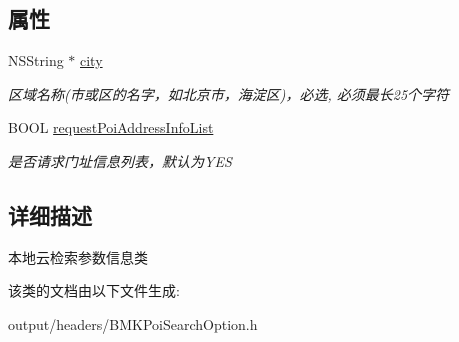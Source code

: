 \subsection*{属性}
\begin{DoxyCompactItemize}
\item 
\hypertarget{interface_b_m_k_city_search_option_af9e2e37c3edcd43445f58660e770f8b1}{}N\+S\+String $\ast$ \hyperlink{interface_b_m_k_city_search_option_af9e2e37c3edcd43445f58660e770f8b1}{city}\label{interface_b_m_k_city_search_option_af9e2e37c3edcd43445f58660e770f8b1}

\begin{DoxyCompactList}\small\item\em 区域名称(市或区的名字，如北京市，海淀区)，必选, 必须最长25个字符 \end{DoxyCompactList}\item 
\hypertarget{interface_b_m_k_city_search_option_abeee3cea1b782d8ca08a558f400568c3}{}B\+O\+O\+L \hyperlink{interface_b_m_k_city_search_option_abeee3cea1b782d8ca08a558f400568c3}{request\+Poi\+Address\+Info\+List}\label{interface_b_m_k_city_search_option_abeee3cea1b782d8ca08a558f400568c3}

\begin{DoxyCompactList}\small\item\em 是否请求门址信息列表，默认为\+Y\+E\+S \end{DoxyCompactList}\end{DoxyCompactItemize}


\subsection{详细描述}
本地云检索参数信息类 

该类的文档由以下文件生成\+:\begin{DoxyCompactItemize}
\item 
output/headers/B\+M\+K\+Poi\+Search\+Option.\+h\end{DoxyCompactItemize}
